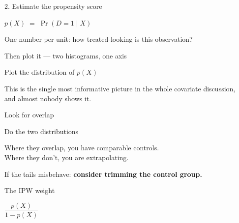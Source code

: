 \documentclass[aspectratio=169,11pt]{beamer}
\begin{document}
\begin{frame}{2. \;Estimate the propensity score}
\vspace{1.4em}
\begin{center}
\Large
$p(X) \;=\; \Pr(D = 1 \mid X)$
\end{center}
\vspace{1.4em}
\begin{center}\color{warmgray}
One number per unit: \;how treated-looking is this observation?
\end{center}
\end{frame}

\begin{frame}{Then plot it --- two histograms, one axis}
\vspace{1em}
\begin{center}
Plot the distribution of $p(X)$ \;
\end{center}
\vspace{1.2em}
\begin{center}\color{warmgray}
This is the single most informative picture in the whole covariate discussion, \\ and almost nobody shows it.
\end{center}
\end{frame}

\begin{frame}{Look for overlap}
\vspace{1.2em}
\begin{center}
\Large Do the two distributions 
\end{center}
\vspace{1.2em}
\begin{center}\color{warmgray}
Where they overlap, you have comparable controls. \\[0.4em]
Where they don't, you are extrapolating.
\end{center}
\vspace{0.8em}
\begin{center}
If the tails misbehave: \;\textbf{consider trimming the control group.}
\end{center}
\end{frame}

\begin{frame}{The IPW weight}
\vspace{1.4em}
\begin{center}
\Large
$\dfrac{p(X)}{1 - p(X)}$
\end{center}
\vspace{1.4em}
\begin{center}
\end{center}
\end{frame}
\end{document}
